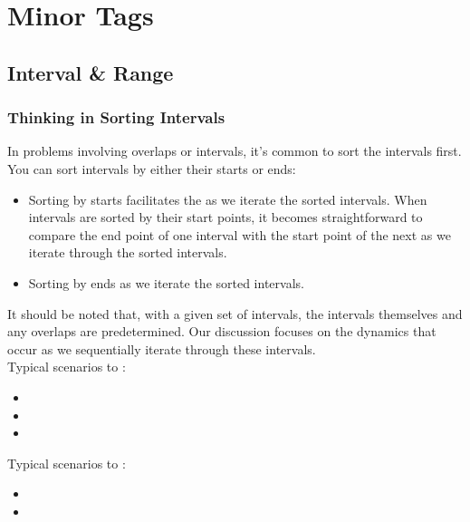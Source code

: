 \chapter{Minor Tags}

\section{Interval \& Range}\label{sec:interval_range}
\subsection{Thinking in Sorting Intervals}
In problems involving overlaps or intervals, it's common to sort the intervals first. You can sort intervals by either their starts or ends:
\begin{itemize}
\item Sorting by starts facilitates the {\color{blue}{early identification and management of overlaps}} as we iterate the sorted intervals. When intervals are sorted by their start points, it becomes straightforward to compare the end point of one interval with the start point of the next as we iterate through the sorted intervals.
\item Sorting by ends {\color{blue}{avoids overlapping as much as possible}} as we iterate the sorted intervals. {\color{blue}{If an overlap does occur, it means there is no way to avoid it by changing the order or intervals.}}
\end{itemize}
It should be noted that, with a given set of intervals, the intervals themselves and any overlaps are predetermined. Our discussion focuses on the dynamics that occur as we sequentially iterate through these intervals.\\

Typical scenarios to {\color{blue}{sort by starts}}:
\begin{itemize}
\item {\color{blue}{Detecting Overlaps}}
\item {\color{blue}{Merging Intervals}}
\item {\color{blue}{Calculating Intersections}}
\end{itemize}

Typical scenarios to {\color{blue}{sort by ends}}:
\begin{itemize}
\item {\color{blue}{Minimizing Overlap}}
\item {\color{blue}{Maximizing Interval Count}}
\end{itemize}

